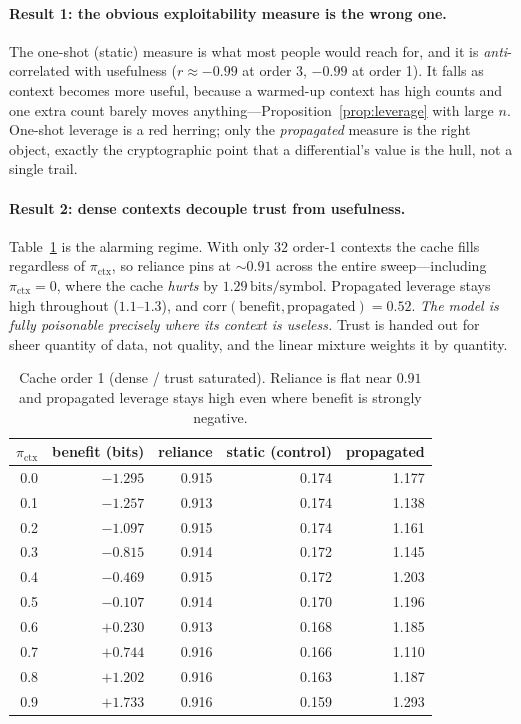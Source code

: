 \documentclass[11pt]{article}
\theoremstyle{plain}
\theoremstyle{definition}
\theoremstyle{remark}
\newcommand{\bits}{\,\text{bits/symbol}}
\newcommand{\pictx}{\pi_{\text{ctx}}}
\begin{document}
\paragraph{Result 1: the obvious exploitability measure is the wrong one.}
The one-shot (static) measure is what most people would reach for, and it is
\emph{anti}-correlated with usefulness ($r\approx-0.99$ at order 3, $-0.99$ at order 1). It
falls as context becomes more useful, because a warmed-up context has high counts and one
extra count barely moves anything---Proposition~\ref{prop:leverage} with large $n$. One-shot
leverage is a red herring; only the \emph{propagated} measure is the right object, exactly
the cryptographic point that a differential's value is the hull, not a single trail.

\paragraph{Result 2: dense contexts decouple trust from usefulness.}
Table~\ref{tab:order1} is the alarming regime. With only $32$ order-1 contexts the cache fills
regardless of $\pictx$, so reliance pins at ${\sim}0.91$ across the entire sweep---including
$\pictx=0$, where the cache \emph{hurts} by $1.29\bits$. Propagated leverage stays high
throughout ($1.1$--$1.3$), and $\mathrm{corr}(\text{benefit},\text{propagated})=0.52$.
\emph{The model is fully poisonable precisely where its context is useless.} Trust is handed
out for sheer quantity of data, not quality, and the linear mixture weights it by quantity.

\begin{table}[t]
\centering\small
\caption{Cache order 1 (dense / trust saturated). Reliance is flat near $0.91$ and
propagated leverage stays high even where benefit is strongly negative.}
\label{tab:order1}
\begin{tabular}{rrrrr}
\toprule
$\pictx$ & benefit (bits) & reliance & static (control) & propagated \\
\midrule
0.0 & $-1.295$ & 0.915 & 0.174 & 1.177 \\
0.1 & $-1.257$ & 0.913 & 0.174 & 1.138 \\
0.2 & $-1.097$ & 0.915 & 0.174 & 1.161 \\
0.3 & $-0.815$ & 0.914 & 0.172 & 1.145 \\
0.4 & $-0.469$ & 0.915 & 0.172 & 1.203 \\
0.5 & $-0.107$ & 0.914 & 0.170 & 1.196 \\
0.6 & $+0.230$ & 0.913 & 0.168 & 1.185 \\
0.7 & $+0.744$ & 0.916 & 0.166 & 1.110 \\
0.8 & $+1.202$ & 0.916 & 0.163 & 1.187 \\
0.9 & $+1.733$ & 0.916 & 0.159 & 1.293 \\
\bottomrule
\end{tabular}
\end{table}
\end{document}
